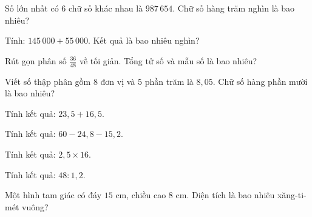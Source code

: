 
\begin{ex}
  Số lớn nhất có 6 chữ số khác nhau là $987\,654$. Chữ số hàng trăm nghìn là bao nhiêu?
\end{ex}

\begin{ex}
  Tính: $145\,000 + 55\,000$. Kết quả là bao nhiêu nghìn?
\end{ex}

\begin{ex}
  Rút gọn phân số $\frac{36}{48}$ về tối giản. Tổng tử số và mẫu số là bao nhiêu?
\end{ex}

\begin{ex}
  Viết số thập phân gồm $8$ đơn vị và $5$ phần trăm là $8{,}05$. Chữ số hàng phần mười là bao nhiêu?
\end{ex}

\begin{ex}
  Tính kết quả: $23{,}5 + 16{,}5$.
\end{ex}

\begin{ex}
  Tính kết quả: $60 - 24{,}8 - 15{,}2$.
\end{ex}

\begin{ex}
  Tính kết quả: $2{,}5 \times 16$.
\end{ex}

\begin{ex}
  Tính kết quả: $48 : 1{,}2$.
\end{ex}

\begin{ex}
  Một hình tam giác có đáy $15\text{ cm}$, chiều cao $8\text{ cm}$. Diện tích là bao nhiêu xăng-ti-mét vuông?
\end{ex}

